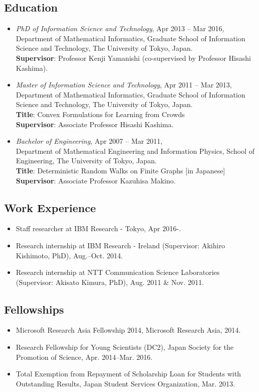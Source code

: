 \documentclass[a4paper,9pt]{article}
\begin{document}
\subsection*{Education}
\begin{itemize}
 \item {\it PhD of Information Science and Technology}, Apr 2013 -- Mar 2016,\\
Department of Mathematical Informatics, Graduate School of Information Science and Technology, The University of Tokyo, Japan.\\
{\bf Supervisor}: Professor Kenji Yamanishi (co-supervised by Professor Hisashi Kashima).
 \item {\it Master of Information Science and Technology}, Apr 2011 -- Mar 2013,\\
Department of Mathematical Informatics, Graduate School of Information Science and Technology, The University of Tokyo, Japan.\\
{\bf Title}: Convex Formulations for Learning from Crowds\\
{\bf Supervisor}: Associate Professor Hisashi Kashima.
 \item {\it Bachelor of Engineering}, Apr 2007 -- Mar 2011, \\
Department of Mathematical Engineering and Information Physics, School of Engineering, The University of Tokyo, Japan.\\
{\bf Title}: Deterministic Random Walks on Finite Graphs [in Japanese]\\
{\bf Supervisor}: Associate Professor Kazuhisa Makino.
\end{itemize}

\subsection*{Work Experience}
\begin{itemize}
 \item Staff researcher at IBM Research - Tokyo, Apr 2016-.
 \item Research internship at IBM Research - Ireland (Supervisor: Akihiro Kishimoto, PhD), Aug.--Oct. 2014.
 \item Research internship at NTT Communication Science Laboratories (Supervisor: Akisato Kimura, PhD), Aug. 2011 \& Nov. 2011.
\end{itemize}

\subsection*{Fellowships}
\begin{itemize}
 \item Microsoft Research Asia Fellowship 2014, Microsoft Research Asia, 2014.
 \item Research Fellowship for Young Scientists (DC2), Japan Society for the Promotion of Science, Apr. 2014--Mar. 2016.
 \item Total Exemption from Repayment of Scholarship Loan for Students with Outstanding Results, Japan Student Services Organization, Mar. 2013.
\end{itemize}
\end{document}

